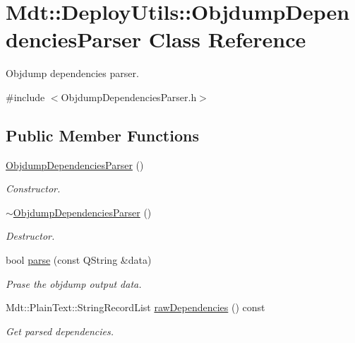 \hypertarget{class_mdt_1_1_deploy_utils_1_1_objdump_dependencies_parser}{}\section{Mdt\+:\+:Deploy\+Utils\+:\+:Objdump\+Dependencies\+Parser Class Reference}
\label{class_mdt_1_1_deploy_utils_1_1_objdump_dependencies_parser}


Objdump dependencies parser.  




{\ttfamily \#include $<$Objdump\+Dependencies\+Parser.\+h$>$}

\subsection*{Public Member Functions}
\begin{DoxyCompactItemize}
\item 
\hyperlink{class_mdt_1_1_deploy_utils_1_1_objdump_dependencies_parser_ae543b682413540d2b3ffb472588a939b}{Objdump\+Dependencies\+Parser} ()
\begin{DoxyCompactList}\small\item\em Constructor. \end{DoxyCompactList}\item 
\hyperlink{class_mdt_1_1_deploy_utils_1_1_objdump_dependencies_parser_a25d5d1b986d8fd8813a400f43e8293b0}{$\sim$\+Objdump\+Dependencies\+Parser} ()
\begin{DoxyCompactList}\small\item\em Destructor. \end{DoxyCompactList}\item 
bool \hyperlink{class_mdt_1_1_deploy_utils_1_1_objdump_dependencies_parser_af70d3b3ccf5bf277e3b294f12c167819}{parse} (const Q\+String \&data)
\begin{DoxyCompactList}\small\item\em Prase the objdump output data. \end{DoxyCompactList}\item 
Mdt\+::\+Plain\+Text\+::\+String\+Record\+List \hyperlink{class_mdt_1_1_deploy_utils_1_1_objdump_dependencies_parser_a772af6ac8d2b7e5dbdc354aeb404db0d}{raw\+Dependencies} () const 
\begin{DoxyCompactList}\small\item\em Get parsed dependencies. \end{DoxyCompactList}\end{DoxyCompactItemize}


